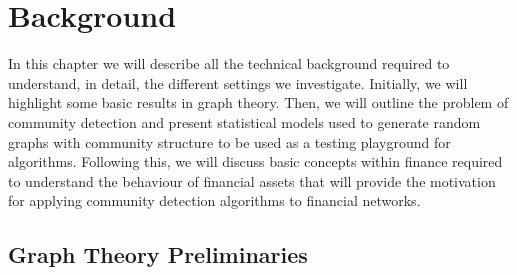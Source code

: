 
\chapter{Background}

\label{cha:background}


In this chapter we will describe all the technical background required to understand, in detail, the different settings we investigate.
Initially, we will highlight some basic results in graph theory.
Then, we will outline the problem of community detection and present statistical models used to generate random graphs with community structure to be used as a testing playground for algorithms.
Following this, we will discuss basic concepts within finance required to understand the behaviour of financial assets that will provide the motivation for applying community detection algorithms to financial networks.


\section{Graph Theory Preliminaries}
\label{sec:graphTheoryBackground}

